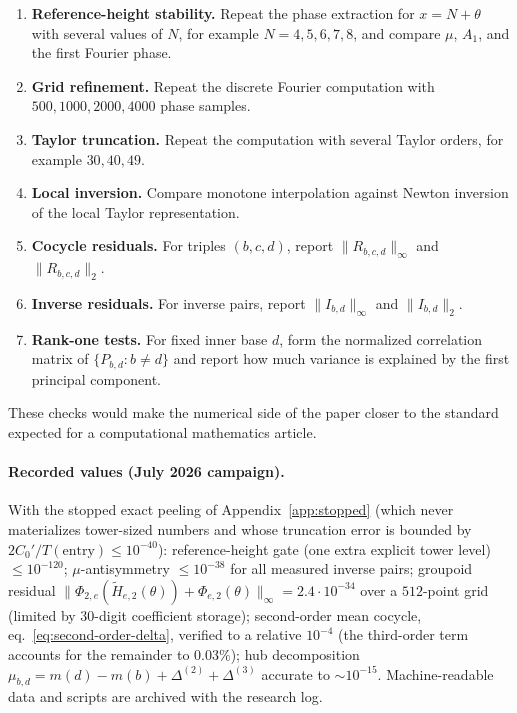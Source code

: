 \documentclass[11pt,a4paper]{article}
\theoremstyle{plain}
\theoremstyle{definition}
\theoremstyle{remark}
\begin{document}
\begin{enumerate}[leftmargin=2em]
  \item \textbf{Reference-height stability.}  Repeat the phase extraction for $x=N+\theta$ with several values of $N$, for example $N=4,5,6,7,8$, and compare $\mu$, $A_1$, and the first Fourier phase.
  \item \textbf{Grid refinement.}  Repeat the discrete Fourier computation with $500,1000,2000,4000$ phase samples.
  \item \textbf{Taylor truncation.}  Repeat the computation with several Taylor orders, for example $30,40,49$.
  \item \textbf{Local inversion.}  Compare monotone interpolation against Newton inversion of the local Taylor representation.
  \item \textbf{Cocycle residuals.}  For triples $(b,c,d)$, report $\|R_{b,c,d}\|_\infty$ and $\|R_{b,c,d}\|_2$.
  \item \textbf{Inverse residuals.}  For inverse pairs, report $\|I_{b,d}\|_\infty$ and $\|I_{b,d}\|_2$.
  \item \textbf{Rank-one tests.}  For fixed inner base $d$, form the normalized correlation matrix of $\{P_{b,d}:b\neq d\}$ and report how much variance is explained by the first principal component.
\end{enumerate}

These checks would make the numerical side of the paper closer to the standard expected for a computational mathematics article.

\paragraph{Recorded values (July 2026 campaign).}  With the stopped exact
peeling of Appendix~\ref{app:stopped} (which never materializes tower-sized
numbers and whose truncation error is bounded by $2C_0'/T(\text{entry})\le
10^{-40}$): reference-height gate (one extra explicit tower level)
$\le10^{-120}$; $\mu$-antisymmetry $\le10^{-38}$ for all measured inverse
pairs; groupoid residual $\|\Phi_{2,e}(\widetilde H_{e,2}(\theta))+
\Phi_{e,2}(\theta)\|_\infty=2.4\cdot10^{-34}$ over a $512$-point grid
(limited by $30$-digit coefficient storage); second-order mean cocycle,
eq.~\eqref{eq:second-order-delta}, verified to a relative $10^{-4}$
(the third-order term accounts for the remainder to $0.03\%$); hub
decomposition $\mu_{b,d}=m(d)-m(b)+\Delta^{(2)}+\Delta^{(3)}$ accurate to
$\sim10^{-15}$.  Machine-readable data and scripts are archived with the
research log.
\end{document}

